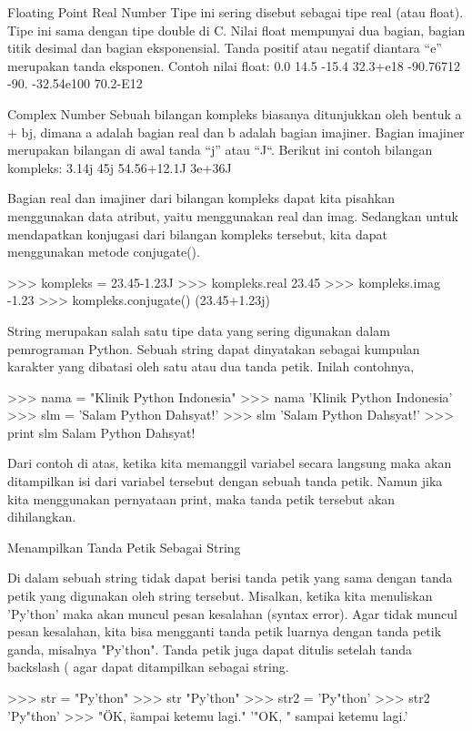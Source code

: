Floating Point Real Number
Tipe ini sering disebut sebagai tipe real (atau float). Tipe ini sama dengan tipe double di C. Nilai float mempunyai dua bagian, bagian titik desimal dan bagian eksponensial. Tanda positif atau negatif diantara “e” merupakan tanda eksponen. Contoh nilai float:
0.0 14.5 -15.4 32.3+e18
-90.76712 -90. -32.54e100 70.2-E12

Complex Number
Sebuah bilangan kompleks biasanya ditunjukkan oleh bentuk a + bj, dimana a adalah bagian real dan b adalah bagian imajiner. Bagian imajiner merupakan bilangan di awal tanda “j” atau “J“. Berikut ini contoh bilangan kompleks:
3.14j 45j 54.56+12.1J 3e+36J

Bagian real dan imajiner dari bilangan kompleks dapat kita pisahkan menggunakan data atribut, yaitu menggunakan real dan imag. Sedangkan untuk mendapatkan konjugasi dari bilangan kompleks tersebut, kita dapat menggunakan metode conjugate().

>>> kompleks = 23.45-1.23J
>>> kompleks.real
23.45
>>> kompleks.imag
-1.23
>>> kompleks.conjugate()
(23.45+1.23j)

String merupakan salah satu tipe data yang sering digunakan dalam pemrograman Python. Sebuah string dapat dinyatakan sebagai kumpulan karakter yang dibatasi oleh satu atau dua tanda petik. Inilah contohnya,

>>> nama = "Klinik Python Indonesia"
>>> nama
'Klinik Python Indonesia'
>>> slm = 'Salam Python Dahsyat!'
>>> slm
'Salam Python Dahsyat!'
>>> print slm
Salam Python Dahsyat!

Dari contoh di atas, ketika kita memanggil variabel secara langsung maka akan ditampilkan isi dari variabel tersebut dengan sebuah tanda petik. Namun jika kita menggunakan pernyataan print, maka tanda petik tersebut akan dihilangkan.

Menampilkan Tanda Petik Sebagai String

Di dalam sebuah string tidak dapat berisi tanda petik yang sama dengan tanda petik yang digunakan oleh string tersebut. Misalkan, ketika kita menuliskan 'Py'thon' maka akan muncul pesan kesalahan (syntax error). Agar tidak muncul pesan kesalahan, kita bisa mengganti tanda petik luarnya dengan tanda petik ganda, misalnya "Py'thon". Tanda petik juga dapat ditulis setelah tanda backslash (\) agar dapat ditampilkan sebagai string.

>>> str = "Py'thon"
>>> str
"Py'thon"
>>> str2 = 'Py"thon'
>>> str2
'Py"thon'
>>> "\"OK, \" sampai ketemu lagi."
'"OK, " sampai ketemu lagi.'

